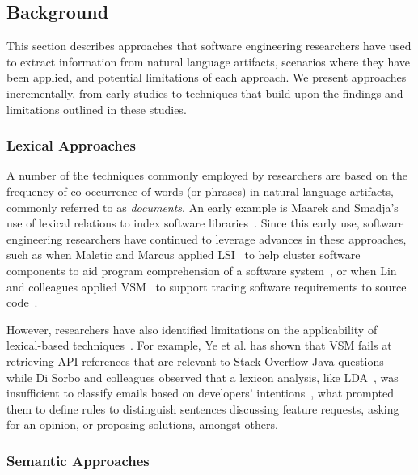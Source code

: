 
\subsection{Background}
\label{cp5:background}


This section describes approaches that software engineering researchers have used to extract information from natural language artifacts, scenarios where they have been applied, and potential limitations of each approach. We present approaches incrementally, from early studies to techniques that build upon the findings
and limitations outlined in these studies.



\subsubsection{Lexical Approaches}


A number of the techniques commonly employed by researchers are based on the
frequency of co-occurrence of words (or phrases) in natural language artifacts, commonly referred to as \textit{documents}. 
An early example is Maarek and Smadja's use of lexical relations to index
software libraries~\cite{maarek1989}. 
Since this early use, software engineering
researchers have continued to leverage advances in
these approaches, such as when 
Maletic and Marcus applied \acf{LSI}~\cite{deerwester1990LSI} to help cluster software components to aid
program comprehension of a software system~\cite{Marcus2003}, or when Lin and colleagues
applied \acf{VSM}~\cite{salton1975vector}
to support tracing software requirements to source code~\cite{Lin2021}.



However, researchers have also identified limitations on the applicability of lexical-based techniques~\cite{silva2019, Ye2016, Sorbo2015}. For example, Ye et al. has shown that \acs{VSM} 
fails at retrieving API references that are relevant to Stack Overflow Java questions~\cite{Ye2016} while
Di Sorbo and colleagues observed that a lexicon analysis, like \acs{LDA}~\cite{blei2003latent}, was insufficient to classify emails based on developers' intentions~\cite{Sorbo2015}, what prompted them 
to define rules to
distinguish sentences discussing feature requests, asking for an
opinion, or proposing solutions, amongst others.



\subsubsection{Semantic Approaches}



